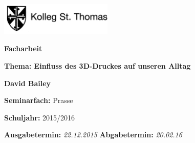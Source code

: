 \begin{titlepage}


\hfill \includegraphics[width=0.4\textwidth]{Logo.png}
\vspace{-1.75cm}

\LARGE{\bf
Facharbeit}

\vspace{1.7cm}
\Large 
\textbf{Thema: Einfluss des 3D-Druckes auf unseren Alltag}


\vfill

{\Large

\textbf{David Bailey} \\

\vspace{0.5cm}


\textbf{Seminarfach:} Prasse \\

\vspace{0.5cm}


\textbf{Schuljahr:} 2015/2016 \\

\vspace{0.5cm}


\textbf{Ausgabetermin: } \emph{22.12.2015} \hfill \textbf{Abgabetermin:} \emph{20.02.16}
}

\vspace{1cm}
\end{titlepage}
